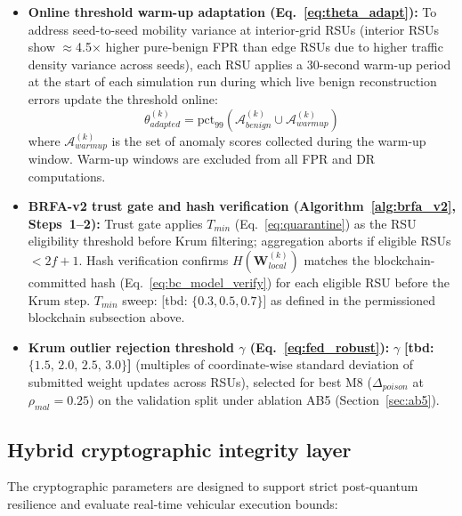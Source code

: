 \documentclass[12pt, a4paper]{report}
\begin{document}
{{\begin{itemize}
    \item \textbf{Online threshold warm-up adaptation
    (Eq.~\ref{eq:theta_adapt}):}
    To address seed-to-seed mobility variance at
    interior-grid \ac{RSU}s (interior \ac{RSU}s show
    $\approx$4.5$\times$ higher pure-benign \ac{FPR}
    than edge \ac{RSU}s due to higher traffic density
    variance across seeds), each \ac{RSU} applies a
    30-second warm-up period at the start of each
    simulation run during which live benign
    reconstruction errors update the threshold online:
    \begin{equation}
    \theta^{(k)}_{adapted} =
    \text{pct}_{99}\!\left(
    \mathcal{A}_{benign}^{(k)}
    \cup
    \mathcal{A}_{warmup}^{(k)}
    \right)
    \label{eq:theta_adapt}
    \end{equation}
    where $\mathcal{A}_{warmup}^{(k)}$ is the set of
    anomaly scores collected during the warm-up window.
    Warm-up windows are excluded from all \ac{FPR}
    and \ac{DR} computations.

    \item \textbf{BRFA-v2 trust gate and hash verification         (Algorithm~\ref{alg:brfa_v2}, Steps~1--2):} Trust gate applies $T_{min}$
            (Eq.~\ref{eq:quarantine}) as the RSU eligibility threshold before Krum filtering; aggregation aborts if eligible RSUs $< 2f{+}1$. Hash verification confirms $H(\mathbf{W}_{local}^{(k)})$ matches the blockchain-committed hash
            (Eq.~\ref{eq:bc_model_verify}) for each eligible RSU before the Krum step.
            $T_{min}$ sweep: [tbd: $\{0.3, 0.5, 0.7\}$] as defined in the permissioned blockchain subsection above.
    \item \textbf{Krum outlier rejection threshold $\gamma$ (Eq.~\ref{eq:fed_robust}):}
        $\gamma$ \textbf{[tbd: $\{1.5,\, 2.0,\, 2.5,\,3.0\}$]} (multiples of coordinate-wise standard deviation of submitted weight updates across RSUs), selected
        for best M8 ($\Delta_{poison}$ at $\rho_{mal} = 0.25$) on the validation split under ablation AB5 (Section~\ref{sec:ab5}).


\end{itemize}

\subsection{Hybrid cryptographic integrity layer}
The cryptographic parameters are designed to support strict post-quantum resilience and evaluate real-time vehicular execution bounds:

}}
\end{document}
